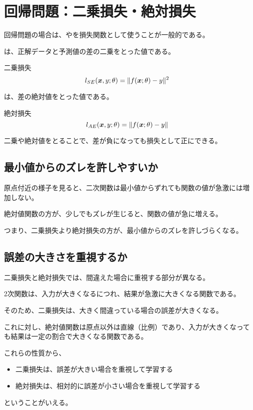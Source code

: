 \documentclass[../../../topic_machine-learning]{subfiles}
\begin{document}
\sectionline
\section{回帰問題：二乗損失・絶対損失}

回帰問題の場合は、やを損失関数として使うことが一般的である。

\br

は、正解データと予測値の差の二乗をとった値である。

\begin{definition}{二乗損失}
  \begin{equation*}
    l_{SE}(\vb*{x}, y; \theta) = \|f(\vb*{x}; \theta) - y\|^2
  \end{equation*}
\end{definition}

は、差の絶対値をとった値である。

\begin{definition}{絶対損失}
  \begin{equation*}
    l_{AE}(\vb*{x}, y; \theta) = \|f(\vb*{x}; \theta) - y\|
  \end{equation*}
\end{definition}

二乗や絶対値をとることで、差が負になっても損失として正にできる。

\subsection{最小値からのズレを許しやすいか}

原点付近の様子を見ると、二次関数は最小値からずれても関数の値が急激には増加しない。

絶対値関数の方が、少しでもズレが生じると、関数の値が急に増える。

\br

つまり、二乗損失より絶対損失の方が、最小値からのズレを許しづらくなる。

\subsection{誤差の大きさを重視するか}

二乗損失と絶対損失では、間違えた場合に重視する部分が異なる。

\br

2次関数は、入力が大きくなるにつれ、結果が急激に大きくなる関数である。

そのため、二乗損失は、大きく間違っている場合の誤差が大きくなる。

\br

これに対し、絶対値関数は原点以外は直線（比例）であり、入力が大きくなっても結果は一定の割合で大きくなる関数である。

\br

これらの性質から、
\begin{itemize}
  \item 二乗損失は、誤差が大きい場合を重視して学習する
  \item 絶対損失は、相対的に誤差が小さい場合を重視して学習する
\end{itemize}
ということがいえる。
\end{document}
